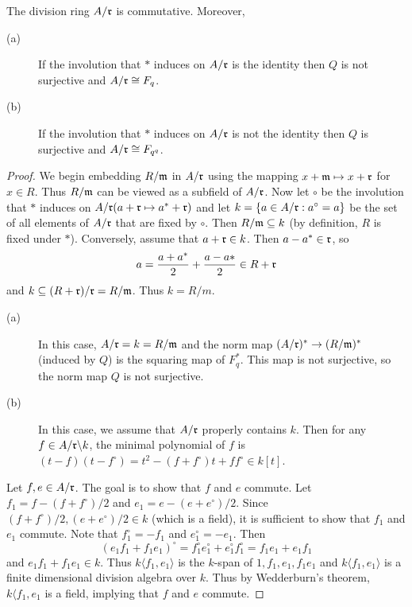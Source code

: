 \begin{proposition}
The division ring $A/\mathfrak{r}$ is commutative. Moreover,
\begin{description}
\item[(a)] If the involution that $*$ induces on $A/\mathfrak{r}$ is the identity then $Q$ is not surjective and $A/\mathfrak{r} \cong F_q$.
\item[(b)] If the involution that $*$ induces on $A/\mathfrak{r}$ is not the identity then $Q$ is surjective and $A/\mathfrak{r} \cong F_{q^q}$.
\end{description}
\end{proposition}
\begin{proof}
We begin embedding $R/\mathfrak{m}$ in $A/\mathfrak{r}$ using the mapping $x + \mathfrak{m} \mapsto x + \mathfrak{r}$ for $x \in R$.
Thus $R/\mathfrak{m}$ can be viewed as a subfield of $A/\mathfrak{r}$.
Now let $\circ$ be the involution that $*$ induces on $A/\mathfrak{r} (a + \mathfrak{r} \mapsto a^* + \mathfrak{r})$
and let $k = \{a \in A/\mathfrak{r} : a^\circ = a \}$ be the set of all elements of $A/\mathfrak{r}$ that are fixed by $\circ$.
Then $R/\mathfrak{m} \subseteq k$ (by definition, $R$ is fixed under $*$).
Conversely, assume that $a + \mathfrak{r} \in k$.
Then $a - a^* \in \mathfrak{r}$, so
\[
a = \frac{a + a^*}{2} + \frac{a - a*}{2} \in R + \mathfrak{r}
\]
and $k \subseteq (R + \mathfrak{r})/\mathfrak{r} = R/\mathfrak{m}$. Thus $k = R/m$.
\begin{description}
\item[(a)] In this case, $A/\mathfrak{r} = k = R/\mathfrak{m}$ and the norm map $(A/\mathfrak{r})^* \to (R/\mathfrak{m})^*$ (induced by $Q$) is the squaring map of $F_q^*$.
This map is not surjective, so the norm map $Q$ is not surjective.
\item[(b)] In this case, we assume that $A/\mathfrak{r}$ properly contains $k$.
Then for any $f \in A/\mathfrak{r} \backslash k$, the minimal polynomial of $f$ is $(t - f)(t - f^\circ) = t^2 - (f + f^\circ)t + f f^\circ \in k[t]$.
\end{description}
Let $f, e \in A/\mathfrak{r}$.
The goal is to show that $f$ and $e$ commute.
Let $f_1 = f - (f + f^\circ) / 2$ and $e_1 = e - (e + e^\circ) / 2$.
Since $(f + f^\circ)/2, (e + e^\circ)/2 \in k$ (which is a field), it is sufficient to show that $f_1$ and $e_1$ commute.
Note that $f_1^\circ = -f_1$ and $e_1^\circ = -e_1$.
Then
\[
(e_1 f_1 + f_1 e_1)^\circ = f_1^\circ e_1^\circ + e_1^\circ f_1^\circ = f_1 e_1 + e_1 f_1
\]
and $e_1 f_1 + f_1 e_1 \in k$.
Thus $k\langle f_1, e_1 \rangle$ is the $k$-span of $1, f_1, e_1, f_1 e_1$ and $k \langle f_1, e_1 \rangle$ is a finite dimensional division algebra over $k$.
Thus by Wedderburn's theorem, $k \langle f_1, e_1$ is a field, implying that $f$ and $e$ commute.


\end{proof}
